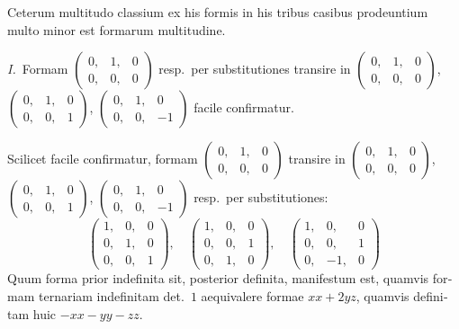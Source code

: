 \documentclass[12pt,a4paper]{article}
\theoremstyle{plain}
\theoremstyle{definition}
\theoremstyle{remark}
\begin{document}
\begin{otherlanguage}{latin}
Ceterum multitudo classium ex his formis in his tribus casibus prodeuntium multo minor est formarum multitudine.

\textit{I.}\ Formam $\begin{pmatrix} 0, & 1, & 0 \\ 0, & 0, & 0 \end{pmatrix}$ resp.\ per substitutiones transire in $\begin{pmatrix} 0, & 1, & 0 \\ 0, & 0, & 0 \end{pmatrix}$, $\begin{pmatrix} 0, & 1, & 0 \\ 0, & 0, & 1 \end{pmatrix}$, $\begin{pmatrix} 0, & 1, & 0 \\ 0, & 0, & -1 \end{pmatrix}$ facile confirmatur.

Scilicet facile confirmatur, formam $\begin{pmatrix} 0, & 1, & 0 \\ 0, & 0, & 0 \end{pmatrix}$ transire in $\begin{pmatrix} 0, & 1, & 0 \\ 0, & 0, & 0 \end{pmatrix}$, $\begin{pmatrix} 0, & 1, & 0 \\ 0, & 0, & 1 \end{pmatrix}$, $\begin{pmatrix} 0, & 1, & 0 \\ 0, & 0, & -1 \end{pmatrix}$ resp.\ per substitutiones:
\[
\begin{pmatrix} 1, & 0, & 0 \\ 0, & 1, & 0 \\ 0, & 0, & 1 \end{pmatrix}, \quad
\begin{pmatrix} 1, & 0, & 0 \\ 0, & 0, & 1 \\ 0, & 1, & 0 \end{pmatrix}, \quad
\begin{pmatrix} 1, & 0, & 0 \\ 0, & 0, & 1 \\ 0, & -1, & 0 \end{pmatrix}
\]
Quum forma prior indefinita sit, posterior definita, manifestum est, quamvis formam ternariam indefinitam det.\ $1$ aequivalere formae $xx + 2yz$, quamvis definitam huic $-xx - yy - zz$.


\end{otherlanguage}
\end{document}
